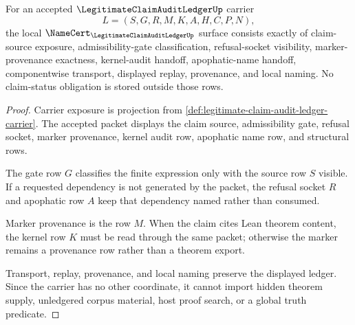 \begin{theorem}
\label{thm:legitimate-claim-audit-ledger-namecert-obligations}
For an accepted $\LegitimateClaimAuditLedgerUp$ carrier
$$
L=(S,G,R,M,K,A,H,C,P,N),
$$
the local $\NameCert_{\LegitimateClaimAuditLedgerUp}$ surface consists exactly of claim-source exposure, admissibility-gate classification, refusal-socket visibility, marker-provenance exactness, kernel-audit handoff, apophatic-name handoff, componentwise transport, displayed replay, provenance, and local naming. No claim-status obligation is stored outside those rows.
\end{theorem}
\begin{proof}
Carrier exposure is projection from \autoref{def:legitimate-claim-audit-ledger-carrier}. The accepted packet displays the claim source, admissibility gate, refusal socket, marker provenance, kernel audit row, apophatic name row, and structural rows.

The gate row $G$ classifies the finite expression only with the source row $S$ visible. If a requested dependency is not generated by the packet, the refusal socket $R$ and apophatic row $A$ keep that dependency named rather than consumed.

Marker provenance is the row $M$. When the claim cites Lean theorem content, the kernel row $K$ must be read through the same packet; otherwise the marker remains a provenance row rather than a theorem export.

Transport, replay, provenance, and local naming preserve the displayed ledger. Since the carrier has no other coordinate, it cannot import hidden theorem supply, unledgered corpus material, host proof search, or a global truth predicate.
\end{proof}

